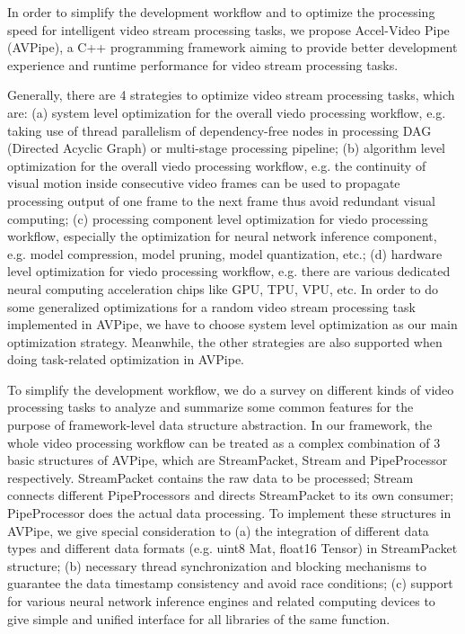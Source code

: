 \begin{bigabstract}
In order to simplify the development workflow and to optimize the processing speed for intelligent video stream processing tasks, we propose Accel-Video Pipe (AVPipe),  a C++ programming framework aiming to provide better development experience and runtime performance for video stream processing tasks.

Generally, there are 4 strategies to optimize video stream processing tasks, which are: (a) system level optimization for the overall viedo processing workflow, e.g. taking use of thread parallelism of dependency-free nodes in processing DAG (Directed Acyclic Graph) or multi-stage processing pipeline;  (b) algorithm level optimization for the overall viedo processing workflow, e.g. the continuity of visual motion inside consecutive video frames can be used to propagate processing output of one frame to the next frame thus avoid redundant visual computing; (c) processing component level optimization for viedo processing workflow, especially the optimization for neural network inference component, e.g. model compression, model pruning, model quantization, etc.; (d) hardware level optimization for viedo processing workflow, e.g.  there are various dedicated neural computing acceleration chips like GPU, TPU, VPU, etc. In order to do some generalized optimizations for a random video stream processing task implemented in AVPipe, we have to choose system level optimization as our main optimization strategy. Meanwhile, the other strategies are also supported when doing task-related optimization in AVPipe.

To simplify the development workflow, we do a survey on different kinds of video processing tasks to analyze and summarize some common features for the purpose of framework-level data structure abstraction. In our framework, the whole video processing workflow can be treated as a complex combination of 3 basic structures of AVPipe, which are StreamPacket, Stream and PipeProcessor respectively. StreamPacket contains the raw data to be processed; Stream connects different PipeProcessors and directs StreamPacket to its own consumer; PipeProcessor does the actual data processing. To implement these structures in AVPipe, we give special consideration to (a) the integration of different data types and different data formats (e.g. uint8 Mat, float16 Tensor) in StreamPacket structure; (b) necessary thread synchronization and blocking mechanisms to guarantee the data timestamp consistency and avoid race conditions; (c) support for various neural network inference engines and related  computing devices to give simple and unified interface for all libraries of the same function. 


\end{bigabstract}
